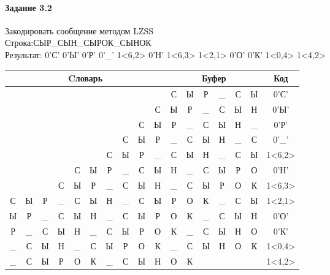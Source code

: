 \documentclass[a4paper, 12pt]{article}
\begin{document}
\paragraph{Задание 3.2}

Закодировать сообщение методом LZSS\\
Строка:СЫР\_СЫН\_СЫРОК\_СЫНОК\\
Результат: 0'С' 0'Ы' 0'Р' 0'\_' 1<6,2> 0'Н' 1<6,3> 1<2,1> 0'О' 0'К' 1<0,4> 1<4,2>\\
\begin{table}[h!]
\centering
\begin{tabular}{|c|c|c|c|c|c|c|c|c|c|c|c|c|c|c|c|c|}
\hline
\multicolumn{10}{|c|}{Cловарь} & \multicolumn{6}{c|}{Буфер} & Код  \\ \hline
  &   &   &   &   &   &   &   &   &   & С & Ы & Р & \_ & С & Ы & 0'С'\\ \hline
  &   &   &   &   &   &   &   &   & С & Ы & Р & \_ & С & Ы & Н & 0'Ы'\\ \hline
  &   &   &   &   &   &   &   & С & Ы & Р & \_ & С & Ы & Н & \_ & 0'Р'\\ \hline
  &   &   &   &   &   &   & С & Ы & Р & \_ & С & Ы & Н & \_ & С & 0'\_'\\ \hline
  &   &   &   &   &   & \cellcolor[HTML]{FFFF00} С & \cellcolor[HTML]{FFFF00} Ы & Р & \_ & \cellcolor[HTML]{FFFF00} С & \cellcolor[HTML]{FFFF00} Ы & Н & \_ & С & Ы & 1<6,2>\\ \hline
  &   &   &   & С & Ы & Р & \_ & С & Ы & Н & \_ & С & Ы & Р & О & 0'Н'\\ \hline
  &   &   & С & Ы & Р & \cellcolor[HTML]{FFFF00} \_ & \cellcolor[HTML]{FFFF00} С & \cellcolor[HTML]{FFFF00} Ы & Н & \cellcolor[HTML]{FFFF00} \_ & \cellcolor[HTML]{FFFF00} С & \cellcolor[HTML]{FFFF00} Ы & Р & О & К & 1<6,3>\\ \hline
С & Ы & \cellcolor[HTML]{FFFF00} Р & \_ & С & Ы & Н & \_ & С & Ы & \cellcolor[HTML]{FFFF00} Р & О & К & \_ & С & Ы & 1<2,1>\\ \hline
Ы & Р & \_ & С & Ы & Н & \_ & С & Ы & Р & О & К & \_ & С & Ы & Н & 0'О'\\ \hline
Р & \_ & С & Ы & Н & \_ & С & Ы & Р & О & К & \_ & С & Ы & Н & О & 0'К'\\ \hline
\cellcolor[HTML]{FFFF00} \_ & \cellcolor[HTML]{FFFF00} С & \cellcolor[HTML]{FFFF00} Ы & \cellcolor[HTML]{FFFF00} Н & \_ & С & Ы & Р & О & К & \cellcolor[HTML]{FFFF00} \_ & \cellcolor[HTML]{FFFF00} С & \cellcolor[HTML]{FFFF00} Ы & \cellcolor[HTML]{FFFF00} Н & О & К & 1<0,4>\\ \hline
\_ & С & Ы & Р & \cellcolor[HTML]{FFFF00} О & \cellcolor[HTML]{FFFF00} К & \_ & С & Ы & Н & \cellcolor[HTML]{FFFF00} О & \cellcolor[HTML]{FFFF00} К &   &   &   &   & 1<4,2>\\ \hline
\end{tabular}
\end{table}
\end{document}
